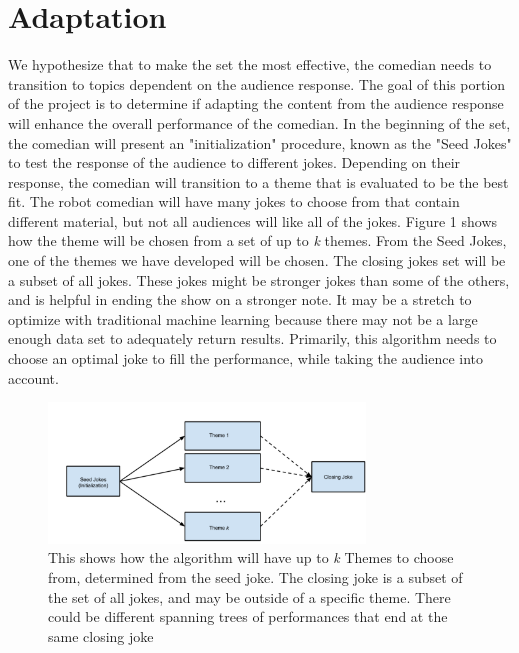 \documentclass[onecolumn, draftclsnofoot,10pt, compsoc]{IEEEtran}
\begin{document}
\section{Adaptation}
  We hypothesize that to make the set the most effective, the comedian needs to transition to topics dependent on the audience response. The goal of this portion of the project is to determine if adapting the content from the audience response will enhance the overall performance of the comedian. In the beginning of the set, the comedian will present an "initialization" procedure, known as the "Seed Jokes" to test the response of the audience to different jokes. Depending on their response, the comedian will transition to a theme that is evaluated to be the best fit. The robot comedian will have many jokes to choose from that contain different material, but not all audiences will like all of the jokes. Figure 1 shows how the theme will be chosen from a set of up to \textit{k} themes. From the Seed Jokes, one of the themes we have developed will be chosen. The closing jokes set will be a subset of all jokes. These jokes might be stronger jokes than some of the others, and is helpful in ending the show on a stronger note. It may be a stretch to optimize with traditional machine learning because there may not be a large enough data set to adequately return results. Primarily, this algorithm needs to choose an optimal joke to fill the performance, while taking the audience into account.

\begin{figure}[H]
  \centering
  \includegraphics[width=0.75\textwidth,height=0.75\textheight,keepaspectratio]{fig0}
  \caption{This shows how the algorithm will have up to \textit{k} Themes to choose from, determined from the seed joke. The closing joke is a subset of the set of all jokes, and may be outside of a specific theme. There could be different spanning trees of performances that end at the same closing joke}
\end{figure}
\end{document}
